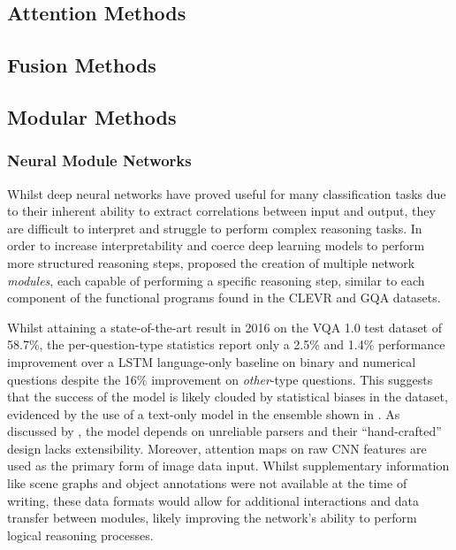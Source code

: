 \subsection{Attention Methods}

\subsection{Fusion Methods}

\subsection{Modular Methods}

\subsubsection{Neural Module Networks}

Whilst deep neural networks have proved useful for many classification tasks due to their inherent ability to extract correlations between input and output, they are difficult to interpret and struggle to perform complex reasoning tasks. In order to increase interpretability and coerce deep learning models to perform more structured reasoning steps, \citeauthor{andreas2016neural} proposed the creation of multiple network \textit{modules}, each capable of performing a specific reasoning step, similar to each component of the functional programs found in the CLEVR \cite{johnson2017clevr} and GQA \cite{hudson2019gqa} datasets.

Whilst attaining a state-of-the-art result in 2016 on the VQA 1.0 test dataset \cite{antol2015vqa} of 58.7\%, the per-question-type statistics report only a 2.5\% and 1.4\% performance improvement over a LSTM language-only baseline on binary and numerical questions despite the 16\% improvement on \textit{other}-type questions. This suggests that the success of the model is likely clouded by statistical biases in the dataset, evidenced by the use of a text-only model in the ensemble shown in \figureautorefname{ \ref{fig:andreas2016neural_neural_module_network}}. As discussed by \citeauthor{hudson2018compositional}, the model depends on unreliable parsers and their ``hand-crafted'' design lacks extensibility. Moreover, attention maps on raw CNN features are used as the primary form of image data input. Whilst supplementary information like scene graphs and object annotations were not available at the time of writing, these data formats would allow for additional interactions and data transfer between modules, likely improving the network's ability to perform logical reasoning processes.

